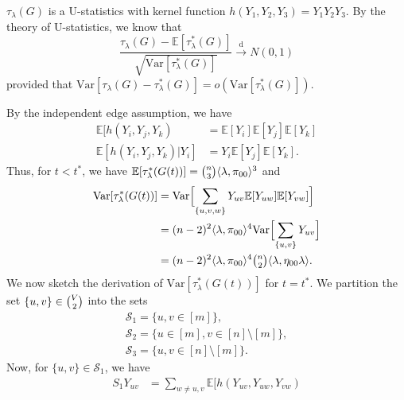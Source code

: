\documentclass[10pt,journal,compsoc]{IEEEtran}
\theoremstyle{definition}
\begin{document}
\begin{IEEEproof}
  $\tau_{\lambda}(G)$ is a U-statistics with kernel function
  $h(Y_1, Y_2, Y_3) = Y_1 Y_2 Y_3$. By the theory of U-statistics, we
  know that
  \begin{equation}
    \label{eq:48}
    \frac{\tau_{\lambda}(G) -
      \mathbb{E}[\tau_{\lambda}^{*}(G)]}{\sqrt{\mathrm{Var}[\tau_{\lambda}^{*}(G)]}}
       \overset{\mathrm{d}}{\longrightarrow}  N(0,1)
  \end{equation}
  provided that $\mathrm{Var}[\tau_{\lambda}(G) -
  \tau_{\lambda}^{*}(G)] = o(\mathrm{Var}[\tau_{\lambda}^{*}(G)])$.
  
  By the independent edge assumption, we have
  \begin{align}
    \mathbb{E}[h(Y_i, Y_j, Y_k) &= \mathbb{E}[Y_i]
  \mathbb{E}[Y_j] \mathbb{E}[Y_k] \\ 
  \mathbb{E}[h(Y_i, Y_j, Y_k) |
  Y_i] &= Y_i \mathbb{E}[Y_j] \mathbb{E}[Y_k].
  \end{align}
 Thus, for $t < t^{*}$, we have $\mathbb{E}[\tau_{\lambda}^{*}(G(t))] = \tbinom{n}{3} \langle
  \lambda, \pi_{00} \rangle^{3}$ and
  \begin{equation}
    \begin{split}
      \mathrm{Var}[\tau_{\lambda}^{*}(G(t))] &=
      \mathrm{Var}\Bigl[\sum_{\{u,v,w\}} Y_{uv} \mathbb{E}[Y_{uw}]
      \mathbb{E}[Y_{vw}]\Bigr] \\
      &= (n-2)^{2} \langle \lambda, \pi_{00} \rangle^{4}
      \mathrm{Var}\Bigl[\sum_{\{u,v\}} Y_{uv} \Bigr] \\
      &= (n-2)^{2} \langle \lambda, \pi_{00} \rangle^{4} \tbinom{n}{2}
      \langle \lambda, \eta_{00} \lambda \rangle.
    \end{split}
  \end{equation}
  We now sketch the derivation of
  $\mathrm{Var}[\tau_{\lambda}^{*}(G(t))]$ for $t = t^{*}$. We partition the set
  $\{u,v\} \in \tbinom{V}{2}$ into the sets 
\begin{gather*}
\mathcal{S}_1 = \{ u,v \in [m]
  \}, \\ \mathcal{S}_2 = \{ u \in [m], v \in [n] \setminus [m]\}, \\
  \mathcal{S}_3 = \{ u, v \in [n] \setminus[m]\}.
\end{gather*} Now, for $\{u,v\} \in \mathcal{S}_1$, we have
\begin{equation}
  \label{eq:58}
  \begin{split}
S_1 Y_{uv} &=\sum_{w \not = u,v} \mathbb{E}[h(Y_{uv}, Y_{uw}, Y_{vw})

\end{split}
\end{equation}
\end{IEEEproof}
\end{document}
